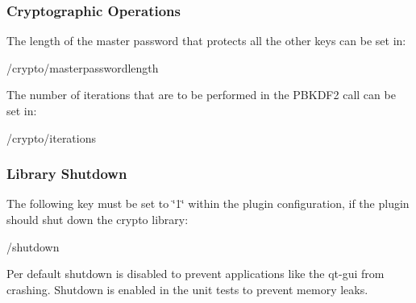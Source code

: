 \subsubsection*{Cryptographic Operations}

The length of the master password that protects all the other keys can be set in\+: \begin{DoxyVerb}/crypto/masterpasswordlength
\end{DoxyVerb}


The number of iterations that are to be performed in the P\+B\+K\+D\+F2 call can be set in\+: \begin{DoxyVerb}/crypto/iterations
\end{DoxyVerb}


\subsubsection*{Library Shutdown}

The following key must be set to {\ttfamily \char`\"{}1\char`\"{}} within the plugin configuration, if the plugin should shut down the crypto library\+: \begin{DoxyVerb}/shutdown
\end{DoxyVerb}


Per default shutdown is disabled to prevent applications like the qt-\/gui from crashing. Shutdown is enabled in the unit tests to prevent memory leaks. 